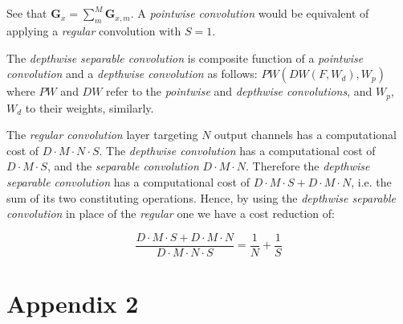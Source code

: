 See that $\mathbf{G}_{x} =  \sum_{m}^{M} \hat{\mathbf{G}}_{x, m}$. A \textit{pointwise convolution} would be equivalent of applying a \textit{regular} convolution with $S=1$. 

The \textit{depthwise separable convolution} is composite function of a \textit{pointwise convolution} and a \textit{depthwise convolution} as follows: $PW(DW(F,W_{d}),W_{p})$ where $PW$ and $DW$ refer to the \textit{pointwise} and \textit{depthwise convolutions}, and $W_{p}$, $W_{d}$ to their weights, similarly.

The \textit{regular convolution} layer targeting $N$ output channels has a computational cost of $D \cdot M \cdot N \cdot S$. The \textit{depthwise convolution} has a computational cost of $D \cdot M \cdot S$,  and the \textit{separable convolution} $D \cdot M \cdot N$. Therefore the \textit{depthwise separable convolution} has a computational cost  of $D \cdot M  \cdot S + D \cdot M \cdot N$, i.e. the sum of its two constituting operations. Hence, by using the \textit{depthwise separable convolution} in place of the \textit{regular} one we have a cost reduction of:

$$ \frac{D \cdot M \cdot S  + D \cdot M \cdot N} {D \cdot M \cdot N \cdot S} = \frac{1}{N} + \frac{1}{S} $$


\newpage

\section*{Appendix 2}

